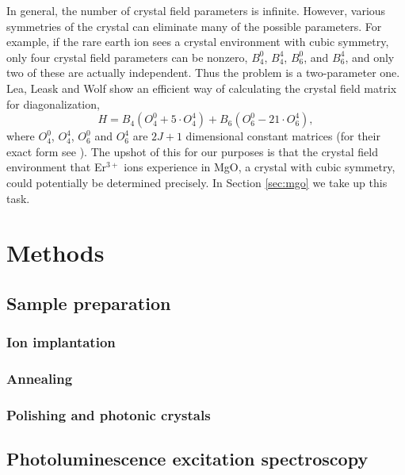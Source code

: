 \documentclass[12pt]{puthesis}
\newcommand{\erbium}[1][ ]{Er$^{3+}$#1}
\begin{document}
In general, the number of crystal field parameters is infinite. However, various symmetries of the crystal can eliminate many of the possible parameters. For example, if the rare earth ion sees a crystal environment with cubic symmetry, only four crystal field parameters can be nonzero, $B_{4}^{0}$, $B_{4}^{4}$, $B_{6}^{0}$, and $B_{6}^{4}$, and only two of these are actually independent. Thus the problem is a two-parameter one. Lea, Leask and Wolf show an efficient way of calculating the crystal field matrix for diagonalization, 
\begin{equation}\label{eq:7}
  H = B_{4}(O_{4}^{0}+ 5\cdot O_{4}^{4}) + B_{6}(O_{6}^{0}-21\cdot O_{6}^{4}),
\end{equation}
where $O_{4}^{0}$, $O_{4}^{4}$, $O_{6}^{0}$ and $O_{6}^{4}$ are $2J+1$ dimensional constant matrices (for their exact form see \cite{Lea1962}). The upshot of this for our purposes is that the crystal field environment that \erbium ions experience in MgO, a crystal with cubic symmetry, could potentially be determined precisely. In Section \ref{sec:mgo} we take up this task.




\chapter{Methods}

\section{Sample preparation}
\label{sec:sample-preparation}

\subsection{Ion implantation}
\label{sec:ion-implantation}

\subsection{Annealing}
\label{sec:annealing}


\subsection{Polishing and photonic crystals}
\label{sec:polishing}

\section{Photoluminescence excitation spectroscopy}
\label{sec:phot-excit-spectr}
\end{document}
